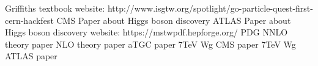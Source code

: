 \begin{thebibliography}{1}
 Griffiths textbook
 website: http://www.isgtw.org/spotlight/go-particle-quest-first-cern-hackfest
 CMS Paper about Higgs boson discovery
 ATLAS Paper about Higgs boson discovery
 website: https://mstwpdf.hepforge.org/
 PDG
 NNLO theory paper
 NLO theory paper
 aTGC paper
 7TeV Wg CMS paper
 7TeV Wg ATLAS paper



\end{thebibliography}
